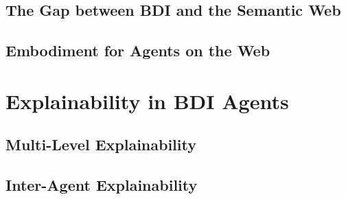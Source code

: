 \subsection{The Gap between BDI and the Semantic Web}

\subsection{Embodiment for Agents on the Web}


\section{Explainability in \acs{BDI} Agents}

\subsection{Multi-Level Explainability}


\subsection{Inter-Agent Explainability}
